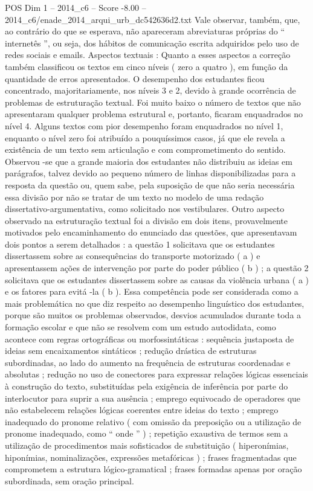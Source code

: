 \begin{textsample}{POS Dim 1 – 2014\_c6 – Score -8.00 – 2014\_c6/enade\_2014\_arqui\_urb\_dc542636d2.txt}
Vale observar, também, que, ao contrário do que se esperava, não apareceram abreviaturas próprias do “ internetês ”, ou seja, dos hábitos de comunicação escrita adquiridos pelo uso de redes sociais e emails.
Aspectos textuais : Quanto a esses aspectos a correção também classificou os textos em cinco níveis ( zero a quatro ), em função da quantidade de erros apresentados.
O desempenho dos estudantes ficou concentrado, majoritariamente, nos níveis 3 e 2, devido à grande ocorrência de problemas de estruturação textual.
Foi muito baixo o número de textos que não apresentaram qualquer problema estrutural e, portanto, ficaram enquadrados no nível 4.
Alguns textos com pior desempenho foram enquadrados no nível 1, enquanto o nível zero foi atribuído a pouquíssimos casos, já que ele revela a existência de um texto sem articulação e com comprometimento do sentido.
Observou -se que a grande maioria dos estudantes não distribuiu as ideias em parágrafos, talvez devido ao pequeno número de linhas disponibilizadas para a resposta da questão ou, quem sabe, pela suposição de que não seria necessária essa divisão por não se tratar de um texto no modelo de uma redação dissertativo-argumentativa, como solicitado nos vestibulares.
Outro aspecto observado na estruturação textual foi a divisão em dois itens, provavelmente motivados pelo encaminhamento do enunciado das questões, que apresentavam dois pontos a serem detalhados : a questão 1 solicitava que os estudantes dissertassem sobre as consequências do transporte motorizado ( a ) e apresentassem ações de intervenção por parte do poder público ( b ) ; a questão 2 solicitava que os estudantes dissertassem sobre as causas da violência urbana ( a ) e os fatores para evitá -la ( b ).
Essa competência pode ser considerada como a mais problemática no que diz respeito ao desempenho linguístico dos estudantes, porque são muitos os problemas observados, desvios acumulados durante toda a formação escolar e que não se resolvem com um estudo autodidata, como acontece com regras ortográficas ou morfossintáticas : sequência justaposta de ideias sem encaixamentos sintáticos ; redução drástica de estruturas subordinadas, ao lado do aumento na frequência de estruturas coordenadas e absolutas ; redução no uso de conectores para expressar relações lógicas essenciais à construção do texto, substituídas pela exigência de inferência por parte do interlocutor para suprir a sua ausência ; emprego equivocado de operadores que não estabelecem relações lógicas coerentes entre ideias do texto ; emprego inadequado do pronome relativo ( com omissão da preposição ou a utilização de pronome inadequado, como “ onde ” ) ; repetição exaustiva de termos sem a utilização de procedimentos mais sofisticados de substituição ( hiperonímias, hiponímias, nominalizações, expressões metafóricas ) ; frases fragmentadas que comprometem a estrutura lógico-gramatical ; frases formadas apenas por oração subordinada, sem oração principal.

\end{textsample}
